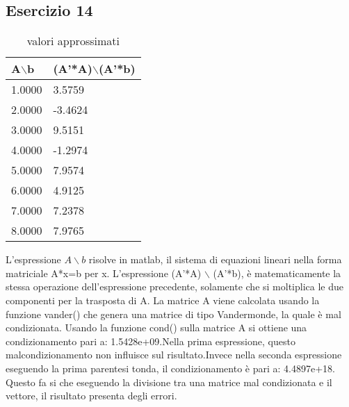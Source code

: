 \subsection{Esercizio 14}

\begin{table}[h]
\begin{tabular}{|l l|}
        \hline
        A$\backslash$b & (A’*A)$\backslash$(A’*b)\\
        \hline
        1.0000& 3.5759 \\
    	2.0000&-3.4624   \\
    	3.0000&  9.5151\\
    	4.0000&-1.2974\\
    	5.0000& 7.9574\\
    	6.0000& 4.9125\\
    	7.0000& 7.2378\\
    	8.0000& 7.9765\\
        \hline
\end{tabular}
\caption{valori approssimati}
\label{tab:14}     
\end{table}

L'espressione $A \backslash b$ risolve in matlab,  il sistema di equazioni lineari nella forma matriciale A*x=b per x.
L'espressione (A'*A) $\backslash$ (A'*b), è matematicamente la stessa operazione dell'espressione precedente, solamente che si moltiplica le due componenti per la trasposta di A. 
La matrice A viene calcolata usando la funzione vander() che genera una matrice di tipo Vandermonde, la quale è  mal condizionata. Usando la funzione cond() sulla matrice A si ottiene una condizionamento pari a: 1.5428e+09.Nella prima espressione, questo malcondizionamento non influisce sul risultato.Invece nella seconda espressione eseguendo la prima parentesi tonda, il condizionamento è pari a: 4.4897e+18. Questo fa si che eseguendo la divisione tra una matrice mal condizionata e il vettore, il risultato presenta degli errori.